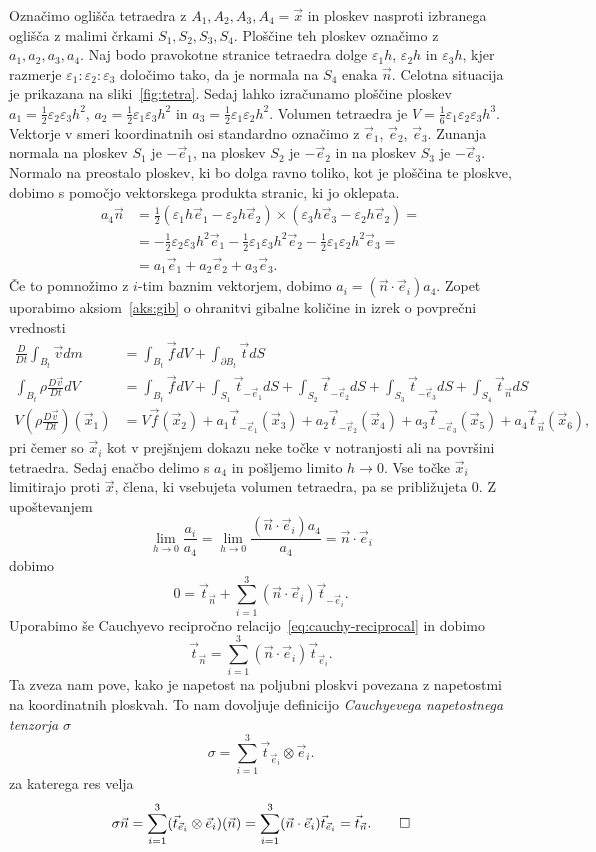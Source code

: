\documentclass[12pt,a4paper]{article}
\theoremstyle{definition} %
\theoremstyle{plain} %
\numberwithin{equation}{section}
\newcommand{\eps}{\varepsilon}
\newcommand{\DD}[2]{\ensuremath{\frac{D #1}{D #2}}}
\newcommand{\DDt}[1]{\DD{#1}{t}}
\newcommand{\vv}{\vec{v}}
\newcommand{\vt}{\vec{t}}
\newcommand{\vn}{\vec{n}}
\newcommand{\vf}{\vec{f}}
\newcommand{\vx}{\vec{x}}
\newcommand{\ei}{\vec{e}_1}
\newcommand{\ej}{\vec{e}_2}
\newcommand{\ek}{\vec{e}_3}
\newcommand{\ts}{\sigma}
\begin{document}
Označimo oglišča tetraedra z $A_1, A_2, A_3, A_4 = \vx$ in ploskev nasproti izbranega
oglišča z malimi črkami $S_1, S_2, S_3, S_4$. Ploščine teh ploskev označimo z
$a_1, a_2, a_3, a_4$.  Naj bodo pravokotne stranice tetraedra
dolge $\eps_1 h$, $\eps_2 h$ in $\eps_3 h$, kjer razmerje $\eps_1 : \eps_2 : \eps_3$
določimo tako, da je normala na $S_4$ enaka $\vn$.
Celotna situacija je prikazana na sliki~\ref{fig:tetra}.
Sedaj lahko izračunamo ploščine ploskev $a_1 = \frac12 \eps_2\eps_3h^2$,
$a_2 = \frac12 \eps_1\eps_3h^2$ in $a_3 = \frac12 \eps_1\eps_2h^2$.
Volumen tetraedra je $V = \frac16 \eps_1\eps_2\eps_3h^3$.
Vektorje v smeri koordinatnih osi standardno označimo z $\ei$, $\ej$, $\ek$.
Zunanja normala na ploskev $S_1$ je $-\ei$, na ploskev $S_2$ je $-\ej$ in na
ploskev $S_3$ je $-\ek$. Normalo na preostalo ploskev, ki bo dolga ravno toliko,
kot je ploščina te ploskve, dobimo s pomočjo vektorskega produkta
stranic, ki jo oklepata.
\begin{align*}
  a_4\vn &= \frac12 (\eps_1h \ei - \eps_2h \ej) \times (\eps_3h \ek - \eps_2h
  \ej) = \\ &=
  -\frac12 \eps_2\eps_3 h^2\ei
  -\frac12 \eps_1\eps_3 h^2\ej
  -\frac12 \eps_1\eps_2 h^2\ek = \\
  &= a_1 \ei + a_2 \ej + a_3 \ek.
\end{align*}
Če to pomnožimo z $i$-tim baznim vektorjem, dobimo $a_i = (\vn\cdot\vec{e}_i)
a_4$.
Zopet uporabimo aksiom~\ref{aks:gib} o ohranitvi gibalne količine in izrek o
povprečni vrednosti
\begin{align*}
  \DDt{} \int_{B_t} \vv dm &= \int_{B_t} \vf dV + \int_{\partial {B_t}} \vt dS \\
\int_{B_t} \rho\DDt{\vv} dV &= \int_{B_t} \vf dV +
  \int_{S_1} \vt_{-\ei} dS +
  \int_{S_2} \vt_{-\ej} dS +
  \int_{S_3} \vt_{-\ek} dS +
  \int_{S_4} \vt_{\vn} dS
  \\
  V (\rho\DDt{\vv})(\vx_1) &= V \vf(\vx_2) +
  a_1 \vt_{-\ei}(\vx_3) + a_2 \vt_{-\ej}(\vx_4) + a_3 \vt_{-\ek}(\vx_5) + a_4
  \vt_{\vn}(\vx_6),
\end{align*}
pri čemer so $\vx_i$ kot v prejšnjem dokazu neke točke v notranjosti ali na
površini tetraedra. Sedaj enačbo delimo s $a_4$ in pošljemo limito $h \to 0$.
Vse točke $\vx_i$ limitirajo proti $\vx$, člena, ki vsebujeta volumen tetraedra,
pa se približujeta 0. Z upoštevanjem
\[
  \lim_{h\to0} \frac{a_i}{a_4} = \lim_{h\to0}\frac{(\vn\cdot\vec{e}_i) a_4}{a_4}
  = \vn\cdot\vec{e}_i
\]
dobimo
\[
  0 = \vt_{\vn} + \sum_{i=1}^3 (\vn \cdot\vec{e}_i) \vt_{-\vec{e}_i}.
\]
Uporabimo še Cauchyevo recipročno relacijo~\eqref{eq:cauchy-reciprocal} in dobimo
\[
  \vt_{\vn} = \sum_{i=1}^3 (\vn \cdot\vec{e}_i) \vt_{\vec{e}_i}.
\]
Ta zveza nam pove, kako je napetost na poljubni ploskvi povezana z napetostmi na
koordinatnih ploskvah.
To nam dovoljuje definicijo \emph{Cauchyevega napetostnega tenzorja}
$\ts$
\[
  \ts = \sum_{i=1}^3 \vt_{\vec{e}_i}\otimes \vec{e}_i.
\]
za katerega res velja
\[
  \ts\vn = \sum_{i=1}^3 (\vt_{\vec{e}_i}\otimes \vec{e}_i)(\vn) =
  \sum_{i=1}^3 (\vn \cdot\vec{e}_i) \vt_{\vec{e}_i} = \vt_{\vn}. \qedhere
\]
\endproof
\end{document}
